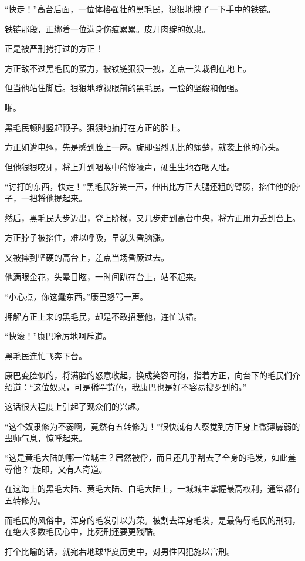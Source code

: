 \begin{this_body}
“快走！”高台后面，一位体格强壮的黑毛民，狠狠地拽了一下手中的铁链。

铁链那段，正绑着一位满身伤痕累累。皮开肉绽的奴隶。

正是被严刑拷打过的方正！

方正敌不过黑毛民的蛮力，被铁链狠狠一拽，差点一头栽倒在地上。

但当他站住脚后。狠狠地瞪视眼前的黑毛民，一脸的坚毅和倔强。

啪。

黑毛民顿时竖起鞭子。狠狠地抽打在方正的脸上。

方正如遭电殛，先是感到脸上一麻。旋即强烈无比的痛楚，就袭上他的心头。

但他狠狠咬牙，将上升到咽喉中的惨嚎声，硬生生地吞咽入肚。

“讨打的东西，快走！”黑毛民狞笑一声，伸出比方正大腿还粗的臂膀，掐住他的脖子，一把将他提起来。

然后，黑毛民大步迈出，登上阶梯，又几步走到高台中央，将方正用力丢到台上。

方正脖子被掐住，难以呼吸，早就头昏脑涨。

又被摔到坚硬的高台上，差点当场昏厥过去。

他满眼金花，头晕目眩，一时间趴在台上，站不起来。

“小心点，你这蠢东西。”康巴怒骂一声。

押解方正上来的黑毛民，却是不敢招惹他，连忙认错。

“快滚！”康巴冷厉地呵斥道。

黑毛民连忙飞奔下台。

康巴变脸似的，将满脸的怒意收起，换成笑容可掬，指着方正，向台下的毛民们介绍道：“这位奴隶，可是稀罕货色，我康巴也是好不容易搜罗到的。”

这话很大程度上引起了观众们的兴趣。

“这个奴隶修为不弱啊，竟然有五转修为！”很快就有人察觉到方正身上微薄孱弱的蛊师气息，惊呼起来。

“这是黄毛大陆的哪一位城主？居然被俘，而且还几乎刮去了全身的毛发，如此羞辱他？”旋即，又有人奇道。

在这海上的黑毛大陆、黄毛大陆、白毛大陆上，一城城主掌握最高权利，通常都有五转修为。

而毛民的风俗中，浑身的毛发引以为荣。被割去浑身毛发，是最侮辱毛民的刑罚，在绝大多数毛民心中，比死刑还要更残酷。

打个比喻的话，就宛若地球华夏历史中，对男性囚犯施以宫刑。


\end{this_body}
